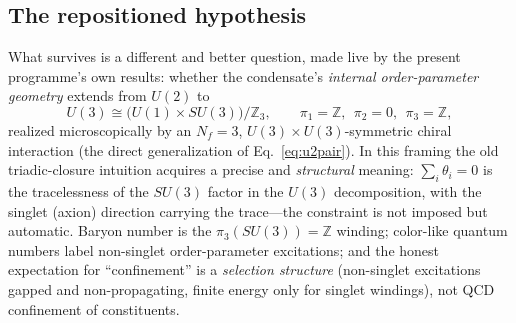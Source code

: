 \documentclass[11pt,a4paper]{article}
\begin{document}
\subsection*{The repositioned hypothesis}
What survives is a different and better question, made live by
the present programme's own results: whether the condensate's
\emph{internal order-parameter geometry} extends from $U(2)$ to
\begin{equation}
U(3) \cong \bigl(U(1)\times SU(3)\bigr)/\mathbb{Z}_3,
\qquad \pi_1 = \mathbb{Z},\ \ \pi_2 = 0,\ \ \pi_3 = \mathbb{Z},
\end{equation}
realized microscopically by an $N_f = 3$,
$U(3)\times U(3)$-symmetric chiral interaction (the direct
generalization of Eq.~\eqref{eq:u2pair}).  In this framing the
old triadic-closure intuition acquires a precise and
\emph{structural} meaning: $\sum_i\theta_i = 0$ is the
tracelessness of the $SU(3)$ factor in the $U(3)$ decomposition,
with the singlet (axion) direction carrying the trace---the
constraint is not imposed but automatic.  Baryon number is the
$\pi_3(SU(3)) = \mathbb{Z}$ winding; color-like quantum numbers
label non-singlet order-parameter excitations; and the honest
expectation for ``confinement'' is a \emph{selection structure}
(non-singlet excitations gapped and non-propagating, finite
energy only for singlet windings), not QCD confinement of
constituents.
\end{document}
